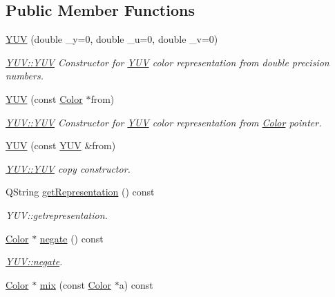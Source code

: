 \subsection*{Public Member Functions}
\begin{DoxyCompactItemize}
\item 
\hyperlink{class_y_u_v_aafa9b0e5ddae51a501c13c9c4b106b84}{Y\+UV} (double \+\_\+y=0, double \+\_\+u=0, double \+\_\+v=0)
\begin{DoxyCompactList}\small\item\em \hyperlink{class_y_u_v_aafa9b0e5ddae51a501c13c9c4b106b84}{Y\+U\+V\+::\+Y\+UV} Constructor for \hyperlink{class_y_u_v}{Y\+UV} color representation from double precision numbers. \end{DoxyCompactList}\item 
\hyperlink{class_y_u_v_a80778948bf90243f1424e06f9dfbbbf1}{Y\+UV} (const \hyperlink{class_color}{Color} $\ast$from)
\begin{DoxyCompactList}\small\item\em \hyperlink{class_y_u_v_aafa9b0e5ddae51a501c13c9c4b106b84}{Y\+U\+V\+::\+Y\+UV} Constructor for \hyperlink{class_y_u_v}{Y\+UV} color representation from \hyperlink{class_color}{Color} pointer. \end{DoxyCompactList}\item 
\hyperlink{class_y_u_v_af6de31964471999a64e34af00ef6e196}{Y\+UV} (const \hyperlink{class_y_u_v}{Y\+UV} \&from)
\begin{DoxyCompactList}\small\item\em \hyperlink{class_y_u_v_aafa9b0e5ddae51a501c13c9c4b106b84}{Y\+U\+V\+::\+Y\+UV} copy constructor. \end{DoxyCompactList}\item 
Q\+String \hyperlink{class_y_u_v_ae38403ffd397003eb28ab7670f95d1e5}{get\+Representation} () const
\begin{DoxyCompactList}\small\item\em Y\+U\+V\+::getrepresentation. \end{DoxyCompactList}\item 
\hyperlink{class_color}{Color} $\ast$ \hyperlink{class_y_u_v_a079872ae88552066ce1abb39cc0a40de}{negate} () const
\begin{DoxyCompactList}\small\item\em \hyperlink{class_y_u_v_a079872ae88552066ce1abb39cc0a40de}{Y\+U\+V\+::negate}. \end{DoxyCompactList}\item 
\hyperlink{class_color}{Color} $\ast$ \hyperlink{class_y_u_v_ab152a4ea37eaa67df0b38882c2099da3}{mix} (const \hyperlink{class_color}{Color} $\ast$a) const

\end{DoxyCompactItemize}
